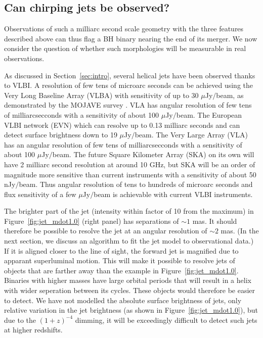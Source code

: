 \documentclass[a4paper,fleqn,usenatbib]{mnras}
\begin{document}
\subsection{Can chirping jets be observed?}

Observations of such a milliarc second scale geometry with the three
features described above can thus flag a BH binary nearing the end of
its merger.  We now consider the question of whether such morphologies
will be measurable in real observations. 

As discussed in Section~\ref{sec:intro}, several helical jets have
been observed thanks to VLBI.  A resolution of few tens of microarc
seconds can be achieved using the Very Long Baseline Array (VLBA) with
sensitivity of up to 30 $\mu$Jy$/$beam, as demonstrated by the MOJAVE
survey \citep{2009AJ....138.1874L}.  VLA has angular resolution of few
tens of milliarcsecconds with a sensitivity of about 100
$\mu$Jy$/$beam.  The European VLBI network (EVN) which can resolve up
to 0.13 milliarc seconds and can detect surface brightness down to 19
$\mu$Jy$/$beam.  The Very Large Array (VLA) has an angular resolution
of few tens of milliarcsecconds with a sensitivity of about 100
$\mu$Jy$/$beam.  The future Square Kilometer Array (SKA) on its own
will have 2 milliarc second resolution at around 10 GHz, but SKA will
be an order of magnitude more sensitive than current instruments with
a sensitivity of about 50 nJy$/$beam.  Thus angular resolution of tens
to hundreds of microarc seconds and flux sensitivity of a few
$\mu$Jy$/$beam is achievable with current VLBI instruments.

The brighter part of the jet (intensity within factor of 10 from the
maximum) in Figure~\ref{fig:jet_mdot1.0} (right panel) has separations
of $\sim 1$ mas.  It should therefore be possible to resolve the jet
at an angular resolution of $\sim 2$ mas.  (In the next section, we
discuss an algorithm to fit the jet model to observational data.)  If
it is aligned closer to the line of sight, the forward jet is
magnified due to apparant superluminal motion.  This will make it
possible to resolve jets of objects that are farther away than the
example in Figure~\ref{fig:jet_mdot1.0}.  Binaries with higher masses
have large orbital periods that will result in a helix with wider
seperation between its cycles.  These objects would therefore be
easier to detect.  We have not modelled the absolute surface
brightness of jets, only relative variation in the jet brightness (as
shown in Figure~\ref{fig:jet_mdot1.0}), but due to the $(1+z)^{-4}$
dimming, it will be exceedingly difficult to detect such jets at
higher redshifts.
\end{document}
